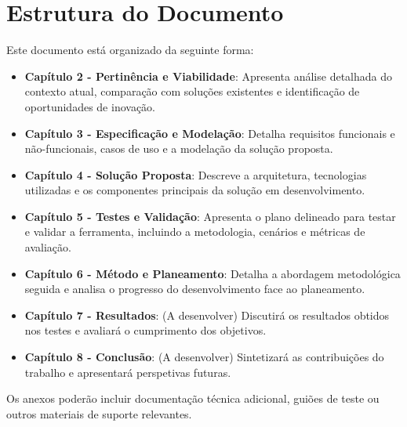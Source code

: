 \section{Estrutura do Documento}

Este documento está organizado da seguinte forma:

\begin{itemize}
    \item \textbf{Capítulo 2 - Pertinência e Viabilidade}: Apresenta análise detalhada do contexto atual, comparação com soluções existentes e identificação de oportunidades de inovação.

    \item \textbf{Capítulo 3 - Especificação e Modelação}: Detalha requisitos funcionais e não-funcionais, casos de uso e a modelação da solução proposta.

    \item \textbf{Capítulo 4 - Solução Proposta}: Descreve a arquitetura, tecnologias utilizadas e os componentes principais da solução em desenvolvimento.

    \item \textbf{Capítulo 5 - Testes e Validação}: Apresenta o plano delineado para testar e validar a ferramenta, incluindo a metodologia, cenários e métricas de avaliação.

    \item \textbf{Capítulo 6 - Método e Planeamento}: Detalha a abordagem metodológica seguida e analisa o progresso do desenvolvimento face ao planeamento.

    \item \textbf{Capítulo 7 - Resultados}: (A desenvolver) Discutirá os resultados obtidos nos testes e avaliará o cumprimento dos objetivos.

    \item \textbf{Capítulo 8 - Conclusão}: (A desenvolver) Sintetizará as contribuições do trabalho e apresentará perspetivas futuras.
\end{itemize}

Os anexos poderão incluir documentação técnica adicional, guiões de teste ou outros materiais de suporte relevantes.
